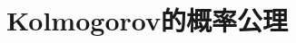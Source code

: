


\chapter{{\selectfont Kolmogorov}的概率公理}

\begin{introduction}
    \item 
\end{introduction}


\section{}


\subsection{}

\subsection{}





\section{}


\subsection{}

\subsection{}






\section{}


\subsection{}

\subsection{}






\section{}


\subsection{}

\subsection{}
